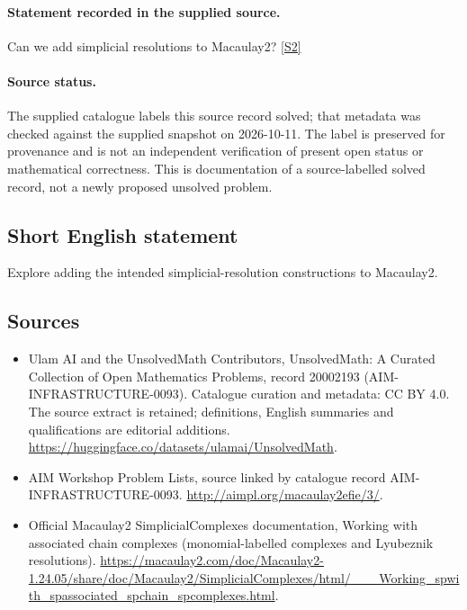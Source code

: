 \documentclass[11pt]{article}
\newcommand{\sref}[2]{\hyperlink{source:#1:#2}{[S#2]}}
\begin{document}
\paragraph{Statement recorded in the supplied source.}
Can we add simplicial resolutions to Macaulay2? \sref{20002193}{2}
\paragraph{Source status.}
The supplied catalogue labels this source record solved; that metadata was checked against the supplied snapshot on 2026-10-11. The label is preserved for provenance and is not an independent verification of present open status or mathematical correctness. This is documentation of a source-labelled solved record, not a newly proposed unsolved problem.
\subsection{Short English statement}
Explore adding the intended simplicial-resolution constructions to Macaulay2.
\subsection{Sources}
\begin{itemize}
\item[\hypertarget{source:20002193:1}{S1}] Ulam AI and the UnsolvedMath Contributors, UnsolvedMath: A Curated Collection of Open Mathematics Problems, record 20002193 (AIM-INFRASTRUCTURE-0093). Catalogue curation and metadata: CC BY 4.0. The source extract is retained; definitions, English summaries and qualifications are editorial additions.
\url{https://huggingface.co/datasets/ulamai/UnsolvedMath}.
\item[\hypertarget{source:20002193:2}{S2}] AIM Workshop Problem Lists, source linked by catalogue record AIM-INFRASTRUCTURE-0093.
\url{http://aimpl.org/macaulay2efie/3/}.
\item[\hypertarget{source:20002193:3}{S3}] Official Macaulay2 SimplicialComplexes documentation, Working with associated chain complexes (monomial-labelled complexes and Lyubeznik resolutions).
\url{https://macaulay2.com/doc/Macaulay2-1.24.05/share/doc/Macaulay2/SimplicialComplexes/html/___Working_spwith_spassociated_spchain_spcomplexes.html}.
\end{itemize}
\end{document}
